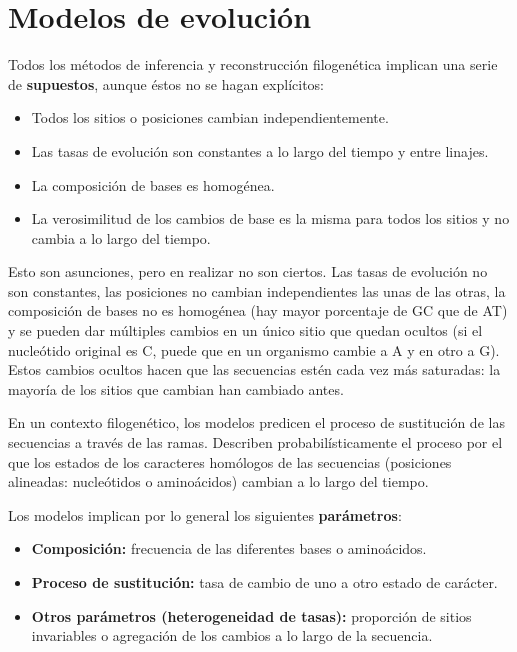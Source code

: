 \chapter{Modelos de evolución}
Todos los métodos de inferencia y reconstrucción filogenética implican una serie de \textbf{supuestos}, aunque éstos no se hagan explícitos: \begin{itemize}
\item Todos los sitios o posiciones cambian independientemente. 
\item Las tasas de evolución son constantes a lo largo del tiempo y entre linajes.
\item La composición de bases es homogénea.
\item La verosimilitud de los cambios de base es la misma para todos los sitios y no cambia a lo largo del tiempo. 
\end{itemize}

Esto son asunciones, pero en realizar no son ciertos. Las tasas de evolución no son constantes, las posiciones no cambian independientes las unas de las otras, la composición de bases no es homogénea (hay mayor porcentaje de GC que de AT) y se pueden dar múltiples cambios en un único sitio que quedan ocultos (si el nucleótido original es C, puede que en un organismo cambie a A y en otro a G). Estos cambios ocultos hacen que las secuencias estén cada vez más saturadas: la mayoría de los sitios que cambian han cambiado antes. 

En un contexto filogenético, los modelos predicen el proceso de sustitución de las secuencias a través de las ramas. Describen probabilísticamente el proceso por el que los estados de los caracteres homólogos de las secuencias (posiciones alineadas: nucleótidos o aminoácidos) cambian a lo largo del tiempo.

Los modelos implican por lo general los siguientes \textbf{parámetros}: \begin{itemize}
\item \textbf{Composición:} frecuencia de las diferentes bases o aminoácidos.
\item \textbf{Proceso de sustitución:} tasa de cambio de uno a otro estado de carácter.
\item \textbf{Otros parámetros (heterogeneidad de tasas):} proporción de sitios invariables o agregación de los cambios a lo largo de la secuencia.
\end{itemize}

